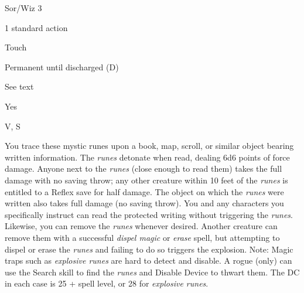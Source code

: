 
\begin{description*}
\item[Level:] Sor/Wiz 3
\item[Casting Time:] 1 standard action
\item[Range:] Touch
\item[Duration:] Permanent until discharged (D)
\item[Saving Throw:] See text
\item[Spell Resistance:] Yes
\item[Components:] V, S
\end{description*}

You trace these mystic runes upon a book, map, scroll, or similar object bearing
written information. The \textit{runes} detonate when read, dealing 6d6 points
of force damage. Anyone next to the \textit{runes} (close enough to read them)
takes the full damage with no saving throw; any other creature within 10 feet of
the \textit{runes} is entitled to a Reflex save for half damage. The object on
which the \textit{runes} were written also takes full damage (no saving throw).
You and any characters you specifically instruct can read the protected writing
without triggering the \textit{runes}. Likewise, you can remove the \textit{runes
}whenever desired. Another creature can remove them with a successful \textit{dispel
magic} or \textit{erase} spell, but attempting to dispel or erase the \textit{runes
}and failing to do so triggers the explosion.
Note: Magic traps such as \textit{explosive runes} are hard to detect
and disable. A rogue (only) can use the Search skill to find the \textit{runes
}and Disable Device to thwart them. The DC in each case is 25 + spell level, or
28 for \textit{explosive runes}.